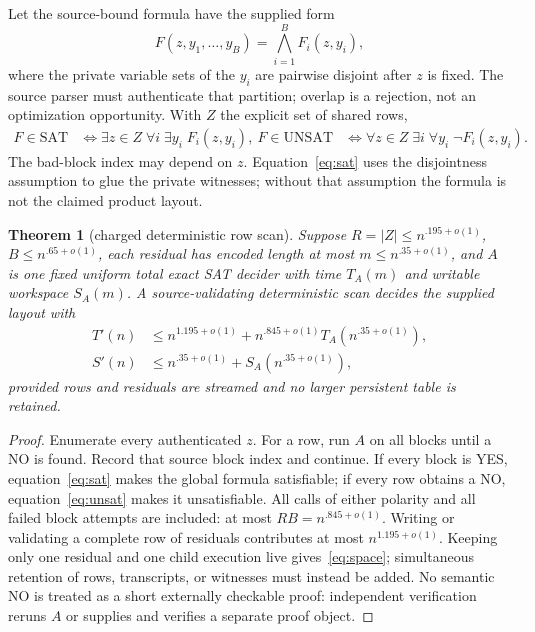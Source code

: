 \documentclass[11pt]{article}
\newtheorem{theorem}{Theorem}
\newcommand{\SAT}{\mathrm{SAT}}
\newcommand{\UNSAT}{\mathrm{UNSAT}}
\begin{document}
Let the source-bound formula have the supplied form
\[
 F(z,y_1,\ldots,y_B)=\bigwedge_{i=1}^{B}F_i(z,y_i),
\]
where the private variable sets of the $y_i$ are pairwise disjoint after $z$ is fixed.  The source parser must authenticate that partition; overlap is a rejection, not an optimization opportunity.  With $Z$ the explicit set of shared rows,
\begin{align}
 F\in\SAT &\iff \exists z\in Z\;\forall i\;\exists y_i\;F_i(z,y_i),\label{eq:sat}\tag{SAT}\
 F\in\UNSAT &\iff \forall z\in Z\;\exists i\;\forall y_i\;\neg F_i(z,y_i).\label{eq:unsat}\tag{UNSAT}
\end{align}
The bad-block index may depend on $z$.  Equation~\eqref{eq:sat} uses the disjointness assumption to glue the private witnesses; without that assumption the formula is not the claimed product layout.

\begin{theorem}[charged deterministic row scan]
Suppose $R=|Z|\le n^{.195+o(1)}$, $B\le n^{.65+o(1)}$, each residual has encoded length at most $m\le n^{.35+o(1)}$, and $A$ is one fixed uniform total exact SAT decider with time $T_A(m)$ and writable workspace $S_A(m)$.  A source-validating deterministic scan decides the supplied layout with
\begin{align}
 T'(n)&\le n^{1.195+o(1)}+n^{.845+o(1)}T_A(n^{.35+o(1)}),\label{eq:time}\tag{1}\\
 S'(n)&\le n^{.35+o(1)}+S_A(n^{.35+o(1)}),\label{eq:space}\tag{2}
\end{align}
provided rows and residuals are streamed and no larger persistent table is retained.
\end{theorem}

\begin{proof}
Enumerate every authenticated $z$.  For a row, run $A$ on all blocks until a NO is found.  Record that source block index and continue.  If every block is YES, equation~\eqref{eq:sat} makes the global formula satisfiable; if every row obtains a NO, equation~\eqref{eq:unsat} makes it unsatisfiable.  All calls of either polarity and all failed block attempts are included: at most $RB=n^{.845+o(1)}$.  Writing or validating a complete row of residuals contributes at most $n^{1.195+o(1)}$.  Keeping only one residual and one child execution live gives~\eqref{eq:space}; simultaneous retention of rows, transcripts, or witnesses must instead be added.  No semantic NO is treated as a short externally checkable proof: independent verification reruns $A$ or supplies and verifies a separate proof object.
\end{proof}
\end{document}
